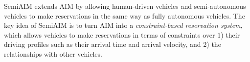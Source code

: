 
SemiAIM extends AIM by allowing human-driven vehicles and
semi-autonomous vehicles to make reservations in the same way as
fully autonomous vehicles.  The key idea of SemiAIM is to turn AIM into a
\emph{constraint-based reservation system}, which allows vehicles to
make reservations in terms of constraints over 1) their driving
profiles such as their arrival time and arrival velocity, and 2) the
relationships with other vehicles.

